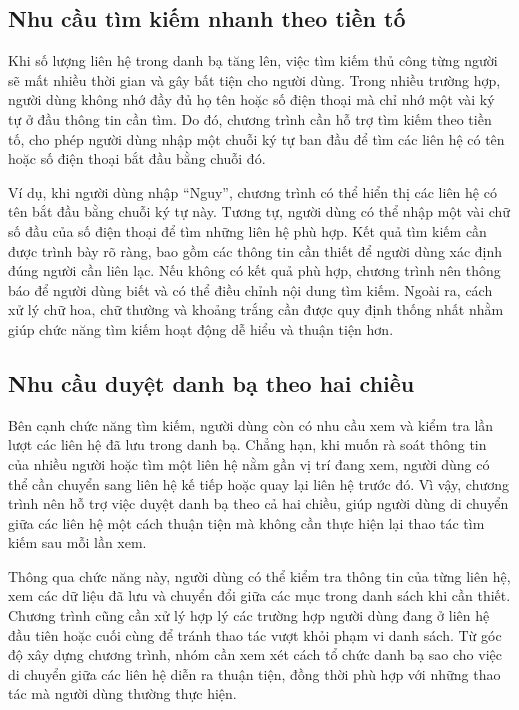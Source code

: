 \documentclass[12pt,a4paper]{report}
\begin{document}
\subsection{Nhu cầu tìm kiếm nhanh theo tiền tố}

Khi số lượng liên hệ trong danh bạ tăng lên, việc tìm kiếm thủ công từng người sẽ mất nhiều thời gian và gây bất tiện cho người dùng. Trong nhiều trường hợp, người dùng không nhớ đầy đủ họ tên hoặc số điện thoại mà chỉ nhớ một vài ký tự ở đầu thông tin cần tìm. Do đó, chương trình cần hỗ trợ tìm kiếm theo tiền tố, cho phép người dùng nhập một chuỗi ký tự ban đầu để tìm các liên hệ có tên hoặc số điện thoại bắt đầu bằng chuỗi đó.\par
Ví dụ, khi người dùng nhập “Nguy”, chương trình có thể hiển thị các liên hệ có tên bắt đầu bằng chuỗi ký tự này. Tương tự, người dùng có thể nhập một vài chữ số đầu của số điện thoại để tìm những liên hệ phù hợp. Kết quả tìm kiếm cần được trình bày rõ ràng, bao gồm các thông tin cần thiết để người dùng xác định đúng người cần liên lạc. Nếu không có kết quả phù hợp, chương trình nên thông báo để người dùng biết và có thể điều chỉnh nội dung tìm kiếm. Ngoài ra, cách xử lý chữ hoa, chữ thường và khoảng trắng cần được quy định thống nhất nhằm giúp chức năng tìm kiếm hoạt động dễ hiểu và thuận tiện hơn.\par
\subsection{Nhu cầu duyệt danh bạ theo hai chiều}

Bên cạnh chức năng tìm kiếm, người dùng còn có nhu cầu xem và kiểm tra lần lượt các liên hệ đã lưu trong danh bạ. Chẳng hạn, khi muốn rà soát thông tin của nhiều người hoặc tìm một liên hệ nằm gần vị trí đang xem, người dùng có thể cần chuyển sang liên hệ kế tiếp hoặc quay lại liên hệ trước đó. Vì vậy, chương trình nên hỗ trợ việc duyệt danh bạ theo cả hai chiều, giúp người dùng di chuyển giữa các liên hệ một cách thuận tiện mà không cần thực hiện lại thao tác tìm kiếm sau mỗi lần xem.\par
Thông qua chức năng này, người dùng có thể kiểm tra thông tin của từng liên hệ, xem các dữ liệu đã lưu và chuyển đổi giữa các mục trong danh sách khi cần thiết. Chương trình cũng cần xử lý hợp lý các trường hợp người dùng đang ở liên hệ đầu tiên hoặc cuối cùng để tránh thao tác vượt khỏi phạm vi danh sách. Từ góc độ xây dựng chương trình, nhóm cần xem xét cách tổ chức danh bạ sao cho việc di chuyển giữa các liên hệ diễn ra thuận tiện, đồng thời phù hợp với những thao tác mà người dùng thường thực hiện.\par
\end{document}

